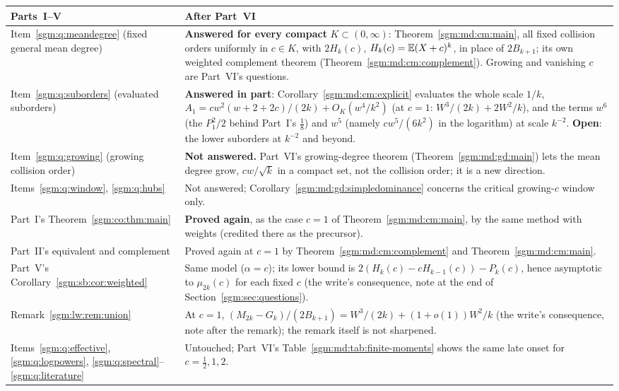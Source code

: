 \documentclass[11pt,letterpaper]{article}
\theoremstyle{remark}\newtheorem{remark}[theorem]{Remark}
\theoremstyle{definition}\newtheorem{definition}[theorem]{Definition}
\begin{document}
\begingroup\small
\renewcommand{\arraystretch}{1.12}
\renewcommand{\theHtable}{sgmmd.answers}%
\begin{longtable}{@{}>{\raggedright\arraybackslash}p{}>{\raggedright\arraybackslash}p{}@{}}
\toprule
Parts~I--V & After Part~VI\\
\midrule
\endhead
Item~\ref{sgm:q:meandegree} (fixed general mean degree) & \textbf{Answered for every compact} $K\subset(0,\infty)$: Theorem~\ref{sgm:md:cm:main}, all fixed collision orders uniformly in $c\in K$, with $2H_k(c)$, $H_k(c)=\mathbb E(X+c)^k$, in place of $2B_{k+1}$; its own weighted complement theorem (Theorem~\ref{sgm:md:cm:complement}). Growing and vanishing $c$ are Part~VI's questions.\\
Item~\ref{sgm:q:suborders} (evaluated suborders) & \textbf{Answered in part}: Corollary~\ref{sgm:md:cm:explicit} evaluates the whole scale $1/k$, $A_1=cw^2(w+2+2c)/(2k)+O_K(w^4/k^2)$ (at $c=1$: $W^3/(2k)+2W^2/k$), and the terms $w^6$ (the $P_1^2/2$ behind Part~I's $\frac18$) and $w^5$ (namely $cw^5/(6k^2)$ in the logarithm) at scale $k^{-2}$. \textbf{Open}: the lower suborders at $k^{-2}$ and beyond.\\
Item~\ref{sgm:q:growing} (growing collision order) & \textbf{Not answered.} Part~VI's growing-degree theorem (Theorem~\ref{sgm:md:gd:main}) lets the mean degree grow, $cw/\sqrt k$ in a compact set, not the collision order; it is a new direction.\\
Items~\ref{sgm:q:window}, \ref{sgm:q:hubs} & Not answered; Corollary~\ref{sgm:md:gd:simpledominance} concerns the critical growing-$c$ window only.\\
Part~I's Theorem~\ref{sgm:co:thm:main} & \textbf{Proved again}, as the case $c=1$ of Theorem~\ref{sgm:md:cm:main}, by the same method with weights (credited there as the precursor).\\
Part~II's equivalent and complement & Proved again at $c=1$ by Theorem~\ref{sgm:md:cm:complement} and Theorem~\ref{sgm:md:cm:main}.\\
Part~V's Corollary~\ref{sgm:sb:cor:weighted} & Same model ($\alpha=c$); its lower bound is $2(H_k(c)-cH_{k-1}(c))-P_k(c)$, hence asymptotic to $\mu_{2k}(c)$ for each fixed $c$ (the write's consequence, note at the end of Section~\ref{sgm:sec:questions}).\\
Remark~\ref{sgm:lw:rem:union} & At $c=1$, $(M_{2k}-G_k)/(2B_{k+1})=W^3/(2k)+(1+o(1))W^2/k$ (the write's consequence, note after the remark); the remark itself is not sharpened.\\
Items~\ref{sgm:q:effective}, \ref{sgm:q:logpowers}, \ref{sgm:q:spectral}--\ref{sgm:q:literature} & Untouched; Part~VI's Table~\ref{sgm:md:tab:finite-moments} shows the same late onset for $c=\frac12,1,2$.\\
\bottomrule
\end{longtable}
\addtocounter{table}{-1}%
\endgroup
\end{document}
